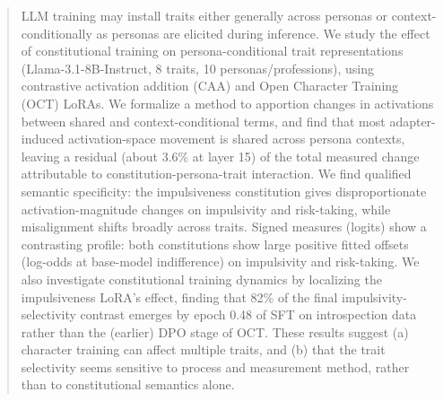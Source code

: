 \documentclass{article}
\begin{document}
\clearpage
\setcounter{page}{1}
\fi

\maketitle
{\renewcommand{\thefootnote}{\fnsymbol{footnote}}%
%
%
%
%
%
}%
\setcounter{footnote}{0}%
\lhead{}\renewcommand{\headrulewidth}{0pt}  %

\begin{abstract}

LLM training may install traits either generally across personas or context-conditionally as personas are elicited during inference. We study the effect of constitutional training on persona-conditional trait representations (Llama-3.1-8B-Instruct, 8 traits, 10 personas/professions), using contrastive activation addition (CAA) and Open Character Training (OCT) LoRAs. We formalize a method to apportion changes in activations between shared and context-conditional terms, and find that most adapter-induced activation-space movement is shared across persona contexts, leaving a residual (about 3.6\% at layer 15) of the total measured change attributable to constitution-persona-trait interaction. We find qualified semantic specificity: the impulsiveness constitution gives disproportionate activation-magnitude changes on impulsivity and risk-taking, while misalignment shifts broadly across traits. Signed measures (logits) show a contrasting profile: both constitutions show large positive fitted offsets (log-odds at base-model indifference) on impulsivity and risk-taking. We also investigate constitutional training dynamics by localizing the impulsiveness LoRA's effect, finding that 82\% of the final impulsivity-selectivity contrast emerges by epoch 0.48 of SFT on introspection data rather than the (earlier) DPO stage of OCT. These results suggest (a) character training can affect multiple traits, and (b) that the trait selectivity seems sensitive to process and measurement method, rather than to constitutional semantics alone.
\end{abstract}
\end{document}

